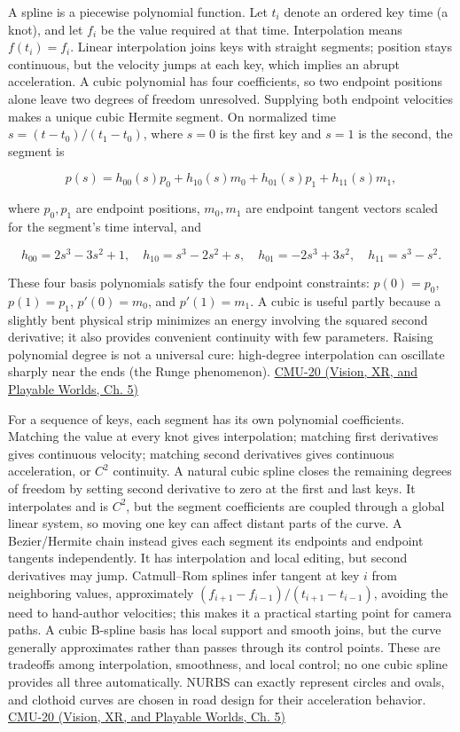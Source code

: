 A spline is a piecewise polynomial function. Let \(t_i\) denote an ordered key time (a knot), and let \(f_i\) be the value required at that time. Interpolation means \(f(t_i)=f_i\). Linear interpolation joins keys with straight segments; position stays continuous, but the velocity jumps at each key, which implies an abrupt acceleration. A cubic polynomial has four coefficients, so two endpoint positions alone leave two degrees of freedom unresolved. Supplying both endpoint velocities makes a unique cubic Hermite segment. On normalized time \(s=(t-t_0)/(t_1-t_0)\), where \(s=0\) is the first key and \(s=1\) is the second, the segment is

\[
p(s)=h_{00}(s)p_0+h_{10}(s)m_0+h_{01}(s)p_1+h_{11}(s)m_1,
\]

where \(p_0,p_1\) are endpoint positions, \(m_0,m_1\) are endpoint tangent vectors scaled for the segment's time interval, and

\[
h_{00}=2s^3-3s^2+1,\quad h_{10}=s^3-2s^2+s,\quad h_{01}=-2s^3+3s^2,\quad h_{11}=s^3-s^2.
\]

These four basis polynomials satisfy the four endpoint constraints: \(p(0)=p_0\), \(p(1)=p_1\), \(p'(0)=m_0\), and \(p'(1)=m_1\). A cubic is useful partly because a slightly bent physical strip minimizes an energy involving the squared second derivative; it also provides convenient continuity with few parameters. Raising polynomial degree is not a universal cure: high-degree interpolation can oscillate sharply near the ends (the Runge phenomenon). \href{../07-Vision-XR-and-Playable-Worlds/main.pdf\#nameddest=04-visual-computing-ii-ch036-cmu-20---introduction-to-animation}{CMU-20 (Vision, XR, and Playable Worlds, Ch. 5)}

For a sequence of keys, each segment has its own polynomial coefficients. Matching the value at every knot gives interpolation; matching first derivatives gives continuous velocity; matching second derivatives gives continuous acceleration, or \(C^2\) continuity. A natural cubic spline closes the remaining degrees of freedom by setting second derivative to zero at the first and last keys. It interpolates and is \(C^2\), but the segment coefficients are coupled through a global linear system, so moving one key can affect distant parts of the curve. A Bezier/Hermite chain instead gives each segment its endpoints and endpoint tangents independently. It has interpolation and local editing, but second derivatives may jump. Catmull--Rom splines infer tangent at key \(i\) from neighboring values, approximately \((f_{i+1}-f_{i-1})/(t_{i+1}-t_{i-1})\), avoiding the need to hand-author velocities; this makes it a practical starting point for camera paths. A cubic B-spline basis has local support and smooth joins, but the curve generally approximates rather than passes through its control points. These are tradeoffs among interpolation, smoothness, and local control; no one cubic spline provides all three automatically. NURBS can exactly represent circles and ovals, and clothoid curves are chosen in road design for their acceleration behavior. \href{../07-Vision-XR-and-Playable-Worlds/main.pdf\#nameddest=04-visual-computing-ii-ch036-cmu-20---introduction-to-animation}{CMU-20 (Vision, XR, and Playable Worlds, Ch. 5)}

